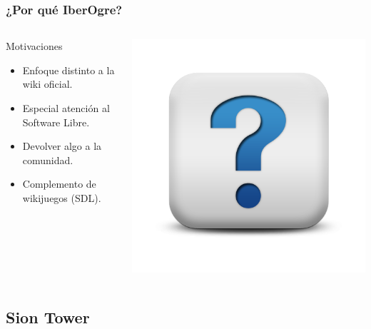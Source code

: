 \documentclass[green]{beamer}
\begin{document}
\begin{frame}
\transdissolve
	\frametitle{¿Por qué IberOgre?}
    
    \begin{columns}[c]
    \column{200pt}
        
	\begin{block}{Motivaciones}
            \begin{itemize}
                \item Enfoque distinto a la wiki oficial.
		\item Especial atención al Software Libre.
		\item Devolver algo a la comunidad.
		\item Complemento de wikijuegos (SDL).
            \end{itemize}            
        \end{block}

    \column{100pt}
	\begin{center}
	    \includegraphics[scale=0.2]{img/question.png}
	\end{center}
    \end{columns} 
\end{frame}

\subsection{Sion Tower}
\end{document}
